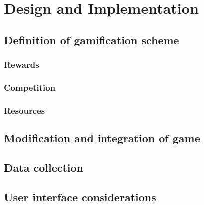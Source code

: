 
\chapter{Design and Implementation} %

\label{desi} %


\section{Definition of gamification scheme}

\subsection{Rewards}

\subsection{Competition}

\subsection{Resources}

\section{Modification and integration of game}

\section{Data collection}

\section{User interface considerations}